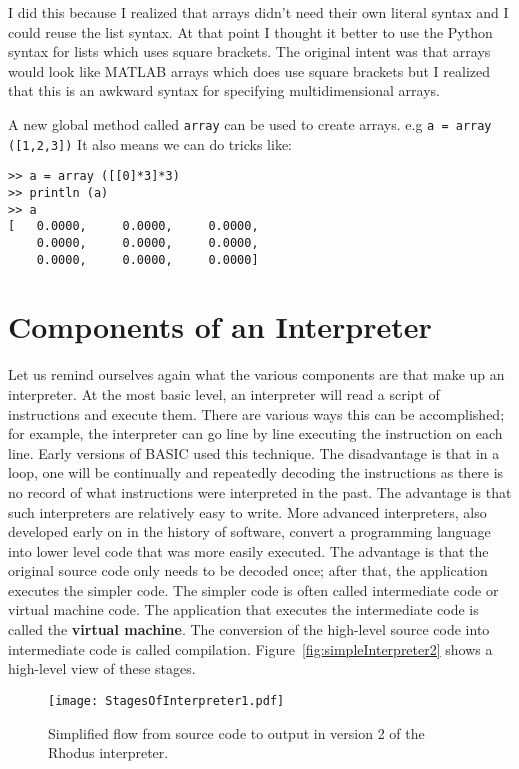 I did this because I realized that arrays didn't need their own literal syntax and I could reuse the list syntax. At that point I thought it better to use the Python syntax for lists which uses square brackets. The original intent was that arrays would look like MATLAB arrays which does use square brackets but I realized that this is an awkward syntax for specifying multidimensional arrays.

A new global method called {\tt array} can be used to create arrays. e.g {\tt a = array ([1,2,3])} It also means we can do tricks like:

\begin{lstlisting}
>> a = array ([[0]*3]*3)
>> println (a)
>> a
[   0.0000,     0.0000,     0.0000,
    0.0000,     0.0000,     0.0000,
    0.0000,     0.0000,     0.0000]
\end{lstlisting}


\section{Components of an Interpreter}

Let us remind ourselves again what the various components are that make up an interpreter. At the most basic level, an interpreter will read a script of instructions and execute them. There are various ways this can be accomplished; for example, the interpreter can go line by line executing the instruction on each line. Early versions of BASIC used this technique. The disadvantage is that in a loop, one will be continually and repeatedly decoding the instructions as there is no record of what instructions were interpreted in the past. The advantage is that such interpreters are relatively easy to write. More advanced interpreters, also developed early on in the history of software, convert a programming language into lower level code that was more easily executed. The advantage is that the original source code only needs to be decoded once; after that, the application executes the simpler code. The simpler code is often called intermediate code or virtual machine code. The application that executes the intermediate code is called the {\bf virtual machine}. The conversion of the high-level source code into intermediate code is called compilation. Figure~\ref{fig:simpleInterpreter2} shows a high-level view of these stages.

\begin{figure}[htpb]
\centering
\texttt{[image: StagesOfInterpreter1.pdf]}
\caption{Simplified flow from source code to output in version 2 of the Rhodus interpreter.}
\label{fig:simpleInterpreter1}
\end{figure}

